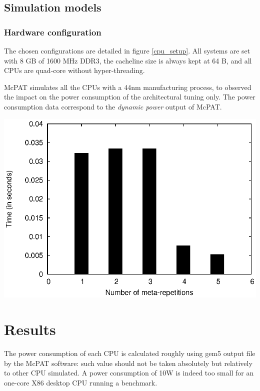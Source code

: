 \documentclass{article}
\newenvironment{Figure}
  {\par\medskip\noindent\center\minipage{0.9\linewidth}}
  {\endminipage\par\bigskip\medskip}
\begin{document}
\begin{multicols}{2}
\subsection{Simulation models}
\subsubsection{Hardware configuration}
The chosen configurations are detailed in figure \ref{cpu_setup}. All systems are set with 8 GB of 1600 MHz DDR3, the cacheline size is always kept at 64 B, and all CPUs are quad-core without hyper-threading.


McPAT simulates all the CPUs with a 44nm manufacturing process, to observed the impact on the power consumption of the architectural tuning only. The power consumption data correspond to the \textit{dynamic power} output of McPAT.

\begin{Figure}
\centering
\bigskip
\includegraphics[width=\linewidth]{nogood.eps}
\end{Figure}

\section{Results}
\label{results}
The power consumption of each CPU is calculated roughly using gem5 output file by the McPAT software: such value should not be taken absolutely but relatively to other CPU simulated. A power consumption of 10W is indeed too small for an one-core X86 desktop CPU running a benchmark. 


\end{multicols}
\end{document}
